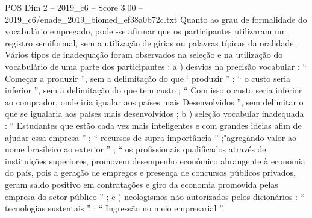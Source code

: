 \begin{textsample}{POS Dim 2 – 2019\_c6 – Score 3.00 – 2019\_c6/enade\_2019\_biomed\_ef38a0b72c.txt}
Quanto ao grau de formalidade do vocabulário empregado, pode -se afirmar que os participantes utilizaram um registro semiformal, sem a utilização de gírias ou palavras típicas da oralidade.
Vários tipos de inadequação foram observados na seleção e na utilização do vocabulário de uma parte dos participantes : a ) desvios na precisão vocabular : “ Começar a produzir ”, sem a delimitação do que ‘ produzir ” ; “ o custo seria inferior ”, sem a delimitação do que tem custo ; “ Com isso o custo seria inferior ao comprador, onde iria igualar aos países mais Desenvolvidos ”, sem delimitar o que se igualaria aos países mais desenvolvidos ; b ) seleção vocabular inadequada : “ Estudantes que estão cada vez mais inteligentes e com grandes ideias afim de ajudar essa empresa ” ; “ recursos de supra importância ” ;"agregando valor ao nome brasileiro ao exterior ” ; “ os profissionais qualificados através de instituições superiores, promovem desempenho econômico abrangente à economia do país, pois a geração de empregos e presença de concursos públicos privados, geram saldo positivo em contratações e giro da economia promovida pelas empresa do setor público ” ; c ) neologismos não autorizados pelos dicionários : “ tecnologias sustentais ” ; “ Ingressão no meio empresarial ”.

\end{textsample}
